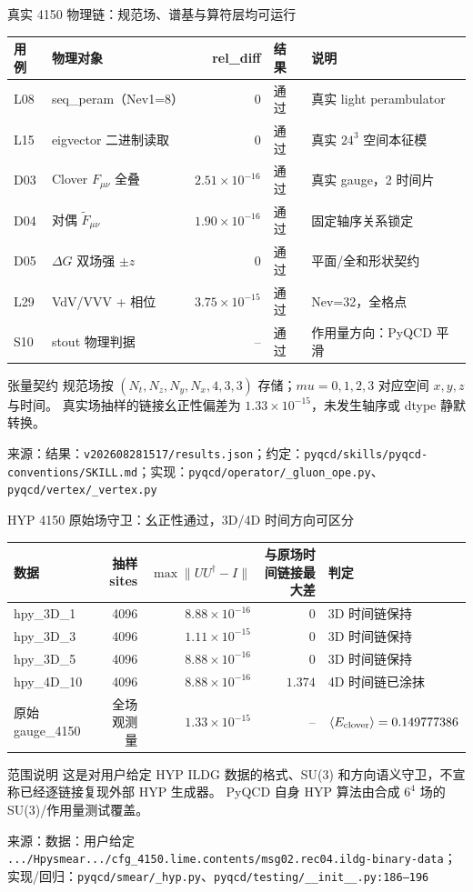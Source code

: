 \documentclass[UTF8,aspectratio=169,11pt]{ctexbeamer}
\newcommand{\source}[1]{\vspace{0.05em}\par{\raggedright\scriptsize\color{muted}来源：#1\par}}
\newcommand{\pass}{\textcolor{evidence}{通过}}
\begin{document}
\begin{frame}[t]{真实 4150 物理链：规范场、谱基与算符层均可运行}
  \small
  \begin{tabularx}{0.96\textwidth}{@{}lYrlY@{}}
    \toprule
    用例 & 物理对象 & rel\_diff & 结果 & 说明\\
    \midrule
    L08 & seq\_peram（Nev1=8） & $0$ & \pass & 真实 light perambulator\\
    L15 & eigvector 二进制读取 & $0$ & \pass & 真实 $24^3$ 空间本征模\\
    D03 & Clover $F_{\mu\nu}$ 全叠 & $2.51\times10^{-16}$ & \pass & 真实 gauge，2 时间片\\
    D04 & 对偶 $\widetilde F_{\mu\nu}$ & $1.90\times10^{-16}$ & \pass & 固定轴序关系锁定\\
    D05 & $\Delta G$ 双场强 $\pm z$ & $0$ & \pass & 平面/全和形状契约\\
    L29 & VdV/VVV + 相位 & $3.75\times10^{-15}$ & \pass & Nev=32，全格点\\
    S10 & stout 物理判据 & -- & \pass & 作用量方向：PyQCD 平滑\\
    \bottomrule
  \end{tabularx}
  \vfill
  \begin{block}{张量契约}
    规范场按 $(N_t,N_z,N_y,N_x,4,3,3)$ 存储；$mu=0,1,2,3$ 对应空间 $x,y,z$ 与时间。
    真实场抽样的链接幺正性偏差为 $1.33\times10^{-15}$，未发生轴序或 dtype 静默转换。
  \end{block}
  \source{结果：\texttt{v202608281517/results.json}；约定：\texttt{pyqcd/skills/pyqcd-conventions/SKILL.md}；实现：\texttt{pyqcd/operator/\_gluon\_ope.py}、\texttt{pyqcd/vertex/\_vertex.py}}
\end{frame}

\begin{frame}[t]{HYP 4150 原始场守卫：幺正性通过，3D/4D 时间方向可区分}
  \small
  \begin{tabularx}{0.96\textwidth}{@{}lrrrY@{}}
    \toprule
    数据 & 抽样 sites & $\max\|UU^\dagger-I\|$ & 与原场时间链接最大差 & 判定\\
    \midrule
    hpy\_3D\_1 & 4096 & $8.88\times10^{-16}$ & $0$ & 3D 时间链保持\\
    hpy\_3D\_3 & 4096 & $1.11\times10^{-15}$ & $0$ & 3D 时间链保持\\
    hpy\_3D\_5 & 4096 & $8.88\times10^{-16}$ & $0$ & 3D 时间链保持\\
    hpy\_4D\_10 & 4096 & $8.88\times10^{-16}$ & $1.374$ & 4D 时间链已涂抹\\
    原始 gauge\_4150 & 全场观测量 & $1.33\times10^{-15}$ & -- & $\langle E_{\rm clover}\rangle=0.149777386$\\
    \bottomrule
  \end{tabularx}
  \vfill
  \begin{block}{范围说明}
    这是对用户给定 HYP ILDG 数据的格式、SU(3) 和方向语义守卫，不宣称已经逐链接复现外部 HYP 生成器。
    PyQCD 自身 HYP 算法由合成 $6^4$ 场的 SU(3)/作用量测试覆盖。
  \end{block}
  \source{数据：用户给定 \texttt{.../Hpysmear.../cfg\_4150.lime.contents/msg02.rec04.ildg-binary-data}；实现/回归：\texttt{pyqcd/smear/\_hyp.py}、\texttt{pyqcd/testing/\_\_init\_\_.py:186--196}}
\end{frame}
\end{document}
